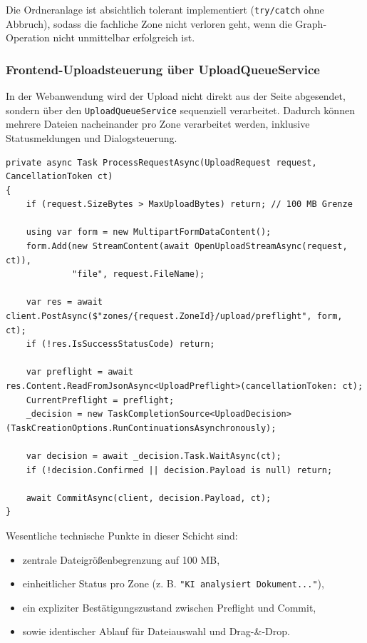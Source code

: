 Die Ordneranlage ist absichtlich tolerant implementiert (\texttt{try/catch} ohne Abbruch), sodass die fachliche Zone nicht verloren geht, wenn die Graph-Operation nicht unmittelbar erfolgreich ist.

\subsubsection{Frontend-Uploadsteuerung über UploadQueueService}

In der Webanwendung wird der Upload nicht direkt aus der Seite abgesendet, sondern über den \texttt{UploadQueueService} sequenziell verarbeitet. Dadurch können mehrere Dateien nacheinander pro Zone verarbeitet werden, inklusive Statusmeldungen und Dialogsteuerung.

\begin{lstlisting}[language={[Sharp]C},caption={Preflight- und Commit-Steuerung im UploadQueueService},label={lst:upload-queue-preflight-commit}]
private async Task ProcessRequestAsync(UploadRequest request, CancellationToken ct)
{
    if (request.SizeBytes > MaxUploadBytes) return; // 100 MB Grenze

    using var form = new MultipartFormDataContent();
    form.Add(new StreamContent(await OpenUploadStreamAsync(request, ct)),
             "file", request.FileName);

    var res = await client.PostAsync($"zones/{request.ZoneId}/upload/preflight", form, ct);
    if (!res.IsSuccessStatusCode) return;

    var preflight = await res.Content.ReadFromJsonAsync<UploadPreflight>(cancellationToken: ct);
    CurrentPreflight = preflight;
    _decision = new TaskCompletionSource<UploadDecision>(TaskCreationOptions.RunContinuationsAsynchronously);

    var decision = await _decision.Task.WaitAsync(ct);
    if (!decision.Confirmed || decision.Payload is null) return;

    await CommitAsync(client, decision.Payload, ct);
}
\end{lstlisting}

Wesentliche technische Punkte in dieser Schicht sind:
\begin{itemize}
    \item zentrale Dateigrößenbegrenzung auf 100 MB,
    \item einheitlicher Status pro Zone (z. B. \texttt{"KI analysiert Dokument..."}),
    \item ein expliziter Bestätigungszustand zwischen Preflight und Commit,
    \item sowie identischer Ablauf für Dateiauswahl und Drag-\&-Drop.
\end{itemize}

